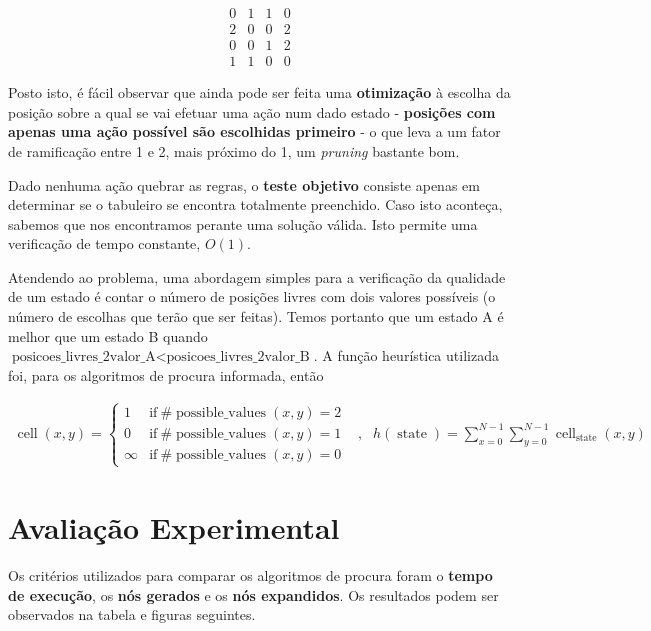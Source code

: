 \documentclass[12pt,a4paper]{article}
\newcommand{\op}{\operatorname}
\begin{document}
\[
  \begin{array}{cccc}
    0 & 1 & 1 & 0 \\
    2 & 0 & 0 & 2 \\
    0 & 0 & 1 & 2 \\
    1 & 1 & 0 & 0
  \end{array}
\]

Posto isto, é fácil observar que ainda pode ser feita uma \textbf{otimização} à escolha da
posição sobre a qual se vai efetuar uma ação num dado estado -
\textbf{posições com apenas uma ação possível são escolhidas primeiro} -
o que leva a um fator de ramificação entre 1 e 2,
mais próximo do 1, um \textit{pruning} bastante bom.

Dado nenhuma ação quebrar as regras, o \textbf{teste objetivo} consiste apenas em determinar
se o tabuleiro se encontra totalmente preenchido. Caso isto aconteça, sabemos que
nos encontramos perante uma solução válida. Isto permite uma verificação de tempo constante, \(O(1)\).

Atendendo ao problema, uma abordagem simples para a verificação da qualidade de
um estado é contar o número de posições livres com dois valores possíveis
(o número de escolhas que terão que ser feitas).
Temos portanto que um estado A é melhor que um estado B quando
\(\text{posicoes\_livres\_2valor\_A} < \text{posicoes\_livres\_2valor\_B}\).
A função heurística utilizada foi, para os algoritmos de procura informada, então

\[
  \begin{aligned}
    \op{cell}(x, y) = \begin{cases}
                        1      & \text{if}~\#\op{possible\_values}(x, y) = 2 \\
                        0      & \text{if}~\#\op{possible\_values}(x, y) = 1 \\
                        \infty & \text{if}~\#\op{possible\_values}(x, y) = 0
                      \end{cases}
     & , &
    h(\op{state}) = \sum^{N-1}_{x=0}\sum^{N-1}_{y=0} \op{cell}_{\op{state}}(x, y)
  \end{aligned}
\]

\section{Avaliação Experimental}

Os critérios utilizados para comparar os algoritmos de procura foram o \textbf{tempo de execução},
os \textbf{nós gerados} e os \textbf{nós expandidos}.
Os resultados podem ser observados na tabela e figuras seguintes.
\end{document}
